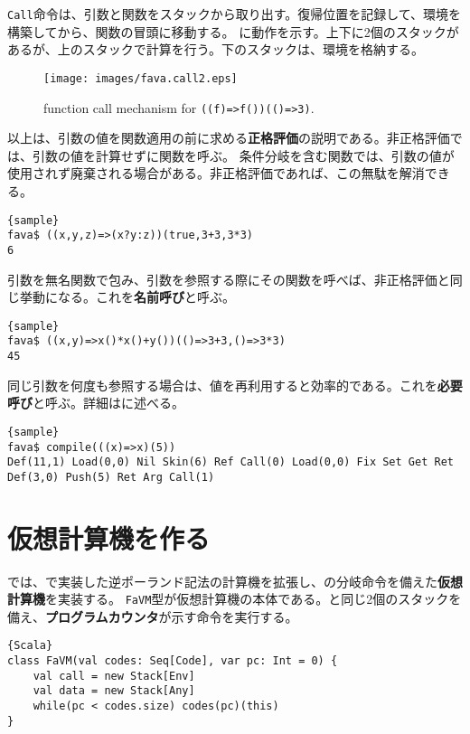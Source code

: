 \documentclass[10pt,a4paper]{book}
\begin{document}
\texttt{Call}命令は、引数と関数をスタックから取り出す。復帰位置を記録して、環境を構築してから、関数の冒頭に移動する。
に動作を示す。上下に2個のスタックがあるが、上のスタックで計算を行う。下のスタックは、環境を格納する。

\begin{figure}[h]
\centering
\texttt{[image: images/fava.call2.eps]}
\caption{function call mechanism for \texttt{((f)=>f())(()=>3)}.\label{fig:call}}
\end{figure}

以上は、引数の値を関数適用の前に求める\textbf{正格評価}の説明である。非正格評価では、引数の値を計算せずに関数を呼ぶ。
条件分岐を含む関数では、引数の値が使用されず廃棄される場合がある。非正格評価であれば、この無駄を解消できる。

\begin{Verbatim}{sample}
fava$ ((x,y,z)=>(x?y:z))(true,3+3,3*3)
6
\end{Verbatim}

引数を無名関数で包み、引数を参照する際にその関数を呼べば、非正格評価と同じ挙動になる。これを\textbf{名前呼び}と呼ぶ。

\begin{Verbatim}{sample}
fava$ ((x,y)=>x()*x()+y())(()=>3+3,()=>3*3)
45
\end{Verbatim}

同じ引数を何度も参照する場合は、値を再利用すると効率的である。これを\textbf{必要呼び}と呼ぶ。詳細はに述べる。

\begin{Verbatim}{sample}
fava$ compile(((x)=>x)(5))
Def(11,1) Load(0,0) Nil Skin(6) Ref Call(0) Load(0,0) Fix Set Get Ret Def(3,0) Push(5) Ret Arg Call(1)
\end{Verbatim}

\chapter{仮想計算機を作る\label{chap:VM}}

では、で実装した逆ポーランド記法の計算機を拡張し、の分岐命令を備えた\textbf{仮想計算機}を実装する。
\texttt{FaVM}型が仮想計算機の本体である。と同じ2個のスタックを備え、\textbf{プログラムカウンタ}が示す命令を実行する。

\begin{Verbatim}{Scala}
class FaVM(val codes: Seq[Code], var pc: Int = 0) {
	val call = new Stack[Env]
	val data = new Stack[Any]
	while(pc < codes.size) codes(pc)(this)
}
\end{Verbatim}
\end{document}
